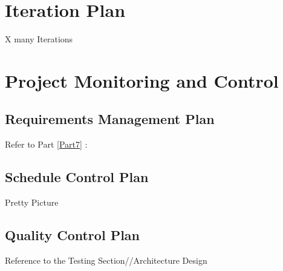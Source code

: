 \section{Iteration Plan}

	X many Iterations


\section{Project Monitoring and Control}


\subsection{Requirements Management Plan}

Refer to Part \ref{Part7} : 


\subsection{Schedule Control Plan}

Pretty Picture


\subsection{Quality Control Plan}

Reference to the Testing Section//Architecture Design


